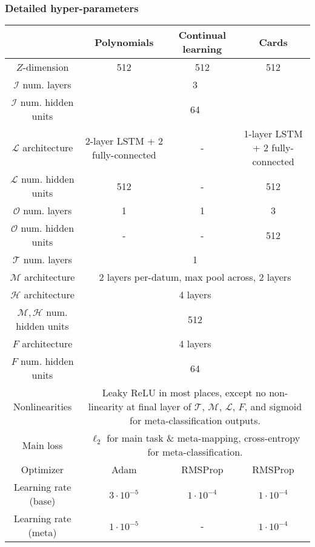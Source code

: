 \subsubsection{Detailed hyper-parameters}
\begin{table}
\centering
\begin{tabular}{|c||c|c|c|}
\hline 
& \phantom{bla}Polynomials\phantom{la} & Continual learning & \phantom{blahb}Cards\phantom{blahb} \\\hline
\hline
$Z$-dimension & 512 & 512 & 512 \\\hline
$\mathcal{I}$ num. layers & \multicolumn{3}{c|}{3} \\\hline 
$\mathcal{I}$ num. hidden units & \multicolumn{3}{c|}{64} \\\hline 
$\mathcal{L}$ architecture & \multicolumn{1}{p{2.5cm}|}{2-layer LSTM + 2 fully-connected} & - & \multicolumn{1}{p{2.5cm}|}{1-layer LSTM + 2 fully-connected} \\\hline 
$\mathcal{L}$ num. hidden units & 512 & - & 512 \\\hline 
$\mathcal{O}$ num. layers & 1 & 1 & 3 \\\hline 
$\mathcal{O}$ num. hidden units & - & - & 512 \\\hline 
$\mathcal{T}$ num. layers & \multicolumn{3}{c|}{1} \\\hline 
$\mathcal{M}$ architecture & \multicolumn{3}{c|}{2 layers per-datum, max pool across, 2 layers} \\\hline 
$\mathcal{H}$ architecture & \multicolumn{3}{c|}{4 layers} \\\hline 
$\mathcal{M}, \mathcal{H}$ num. hidden units & \multicolumn{3}{c|}{512} \\\hline 
$F$ architecture & \multicolumn{3}{c|}{4 layers} \\\hline 
$F$ num. hidden units & \multicolumn{3}{c|}{64} \\\hline 
Nonlinearities & \multicolumn{3}{p{8.5cm}|}{Leaky ReLU in most places, except no non-linearity at final layer of $\mathcal{T}$, $\mathcal{M}$, $\mathcal{L}$, $F$, and sigmoid for meta-classification outputs.} \\\hline
Main loss & \multicolumn{3}{p{8.5cm}|}{$\ell_2$ for main task \& meta-mapping, cross-entropy for meta-classification.}\\\hline
\hline
Optimizer & Adam & RMSProp & RMSProp \\\hline
Learning rate (base) & $3\cdot 10^{-5}$ & $1\cdot 10^{-4}$ & $1\cdot 10^{-4}$\\\hline
Learning rate (meta) & $1\cdot 10^{-5}$ & - & $1\cdot 10^{-4}$\\\hline

\end{tabular}
\end{table}
